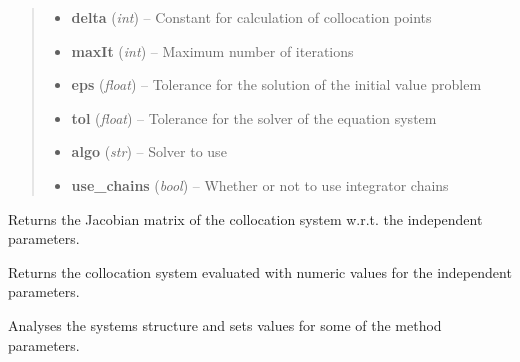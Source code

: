 \documentclass[letterpaper,10pt,english]{sphinxmanual}
\begin{document}
\begin{fulllineitems}
\begin{quote}
\begin{description}
\begin{itemize}
\item {} 
\textbf{delta} (\emph{int}) -- Constant for calculation of collocation points

\item {} 
\textbf{maxIt} (\emph{int}) -- Maximum number of iterations

\item {} 
\textbf{eps} (\emph{float}) -- Tolerance for the solution of the initial value problem

\item {} 
\textbf{tol} (\emph{float}) -- Tolerance for the solver of the equation system

\item {} 
\textbf{algo} (\emph{str}) -- Solver to use

\item {} 
\textbf{use\_chains} (\emph{bool}) -- Whether or not to use integrator chains

\end{itemize}

\end{description}\end{quote}

\begin{fulllineitems}
\label{pytrajectory:pytrajectory.trajectory.Trajectory.DG}
Returns the Jacobian matrix of the collocation system w.r.t. the independent parameters.

\end{fulllineitems}


\begin{fulllineitems}
\label{pytrajectory:pytrajectory.trajectory.Trajectory.G}
Returns the collocation system evaluated with numeric values for the independent parameters.

\end{fulllineitems}


\begin{fulllineitems}
\label{pytrajectory:pytrajectory.trajectory.Trajectory.analyseSystem}
Analyses the systems structure and sets values for some of the method parameters.


\end{fulllineitems}
\end{fulllineitems}
\end{document}
